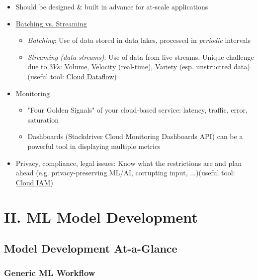 \documentclass[10pt,landscape,letterpaper]{cheatsheet}
\begin{document}
\begin{multicols}{3}
\begin{itemize}
    \item Should be designed \& built in advance for at-scale applications
    \item \href{https://medium.com/simpl-under-the-hood/data-pipeline-batch-vs-stream-processing-d038bdb29e18}{Batching vs. Streaming}
        \begin{itemize}
            \item \emph{Batching}: Use of data stored in data lakes, processed in \textit{periodic} intervals
            \item \emph{Streaming (data streams)}: Use of data from live streams. Unique challenge due to $3Vs$: Volume, Velocity (real-time), Variety (esp. unstructred data) (useful tool: \href{https://cloud.google.com/dataflow/}{Cloud Dataflow})
        \end{itemize}
    \item Monitoring
    \begin{itemize}
        \item "Four Golden Signals" of your cloud-based service: latency, traffic, error, saturation
        \item Dashboards (Stackdriver Cloud Monitoring Dashboards API) can be a powerful tool in displaying multiple metrics
    \end{itemize}
    \item Privacy, compliance, legal issues: Know what the restrictions are and plan ahead (e.g. privacy-preserving ML/AI, corrupting input, ...)(useful tool: \href{https://cloud.google.com/iam}{Cloud IAM})
\end{itemize}

\section{II. ML Model Development}

\subsection{Model Development At-a-Glance}

\subsubsection{Generic ML Workflow}


\end{multicols}
\end{document}
